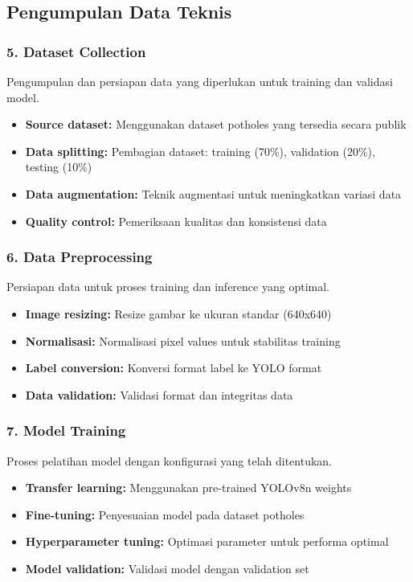 \documentclass[12pt,a4paper]{report}
\begin{document}
\subsection{Pengumpulan Data Teknis}

\subsubsection{5. Dataset Collection}

Pengumpulan dan persiapan data yang diperlukan untuk training dan validasi model.

\begin{itemize}
    \item \textbf{Source dataset:} Menggunakan dataset potholes yang tersedia secara publik
    \item \textbf{Data splitting:} Pembagian dataset: training (70\%), validation (20\%), testing (10\%)
    \item \textbf{Data augmentation:} Teknik augmentasi untuk meningkatkan variasi data
    \item \textbf{Quality control:} Pemeriksaan kualitas dan konsistensi data
\end{itemize}

\subsubsection{6. Data Preprocessing}

Persiapan data untuk proses training dan inference yang optimal.

\begin{itemize}
    \item \textbf{Image resizing:} Resize gambar ke ukuran standar (640x640)
    \item \textbf{Normalisasi:} Normalisasi pixel values untuk stabilitas training
    \item \textbf{Label conversion:} Konversi format label ke YOLO format
    \item \textbf{Data validation:} Validasi format dan integritas data
\end{itemize}

\subsubsection{7. Model Training}

Proses pelatihan model dengan konfigurasi yang telah ditentukan.

\begin{itemize}
    \item \textbf{Transfer learning:} Menggunakan pre-trained YOLOv8n weights
    \item \textbf{Fine-tuning:} Penyesuaian model pada dataset potholes
    \item \textbf{Hyperparameter tuning:} Optimasi parameter untuk performa optimal
    \item \textbf{Model validation:} Validasi model dengan validation set
\end{itemize}
\end{document}
